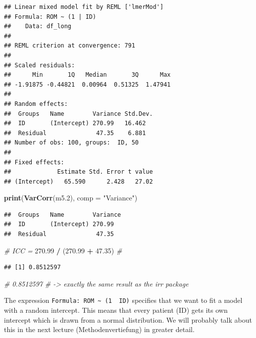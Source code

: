 \documentclass[
]{book}
\newenvironment{Shaded}{\begin{snugshade}}{\end{snugshade}}
\newcommand{\AttributeTok}[1]{\textcolor[rgb]{0.13,0.29,0.53}{#1}}
\newcommand{\CommentTok}[1]{\textcolor[rgb]{0.56,0.35,0.01}{\textit{#1}}}
\newcommand{\FloatTok}[1]{\textcolor[rgb]{0.00,0.00,0.81}{#1}}
\newcommand{\FunctionTok}[1]{\textcolor[rgb]{0.13,0.29,0.53}{\textbf{#1}}}
\newcommand{\NormalTok}[1]{#1}
\newcommand{\SpecialCharTok}[1]{\textcolor[rgb]{0.81,0.36,0.00}{\textbf{#1}}}
\newcommand{\StringTok}[1]{\textcolor[rgb]{0.31,0.60,0.02}{#1}}
\begin{document}
\begin{verbatim}
## Linear mixed model fit by REML ['lmerMod']
## Formula: ROM ~ (1 | ID)
##    Data: df_long
## 
## REML criterion at convergence: 791
## 
## Scaled residuals: 
##      Min       1Q   Median       3Q      Max 
## -1.91875 -0.44821  0.00964  0.51325  1.47941 
## 
## Random effects:
##  Groups   Name        Variance Std.Dev.
##  ID       (Intercept) 270.99   16.462  
##  Residual              47.35    6.881  
## Number of obs: 100, groups:  ID, 50
## 
## Fixed effects:
##             Estimate Std. Error t value
## (Intercept)   65.590      2.428   27.02
\end{verbatim}

\begin{Shaded}
\begin{Highlighting}[]
\FunctionTok{print}\NormalTok{(}\FunctionTok{VarCorr}\NormalTok{(m5}\FloatTok{.2}\NormalTok{), }\AttributeTok{comp =} \StringTok{"Variance"}\NormalTok{)}
\end{Highlighting}
\end{Shaded}

\begin{verbatim}
##  Groups   Name        Variance
##  ID       (Intercept) 270.99  
##  Residual              47.35
\end{verbatim}

\begin{Shaded}
\begin{Highlighting}[]
\CommentTok{\# ICC = }
\FloatTok{270.99} \SpecialCharTok{/}\NormalTok{ (}\FloatTok{270.99} \SpecialCharTok{+} \FloatTok{47.35}\NormalTok{) }\CommentTok{\# }
\end{Highlighting}
\end{Shaded}

\begin{verbatim}
## [1] 0.8512597
\end{verbatim}

\begin{Shaded}
\begin{Highlighting}[]
\CommentTok{\# 0.8512597}
\CommentTok{\# {-}\textgreater{} exactly the same result as the irr package}
\end{Highlighting}
\end{Shaded}

The expression \texttt{Formula:\ ROM\ \textasciitilde{}\ (1\ \textbar{}\ ID)} specifies that we want to fit a model with
a random intercept. This means that every patient (ID) gets its own intercept
which is drawn from a normal distribution. We will probably talk about this in the
next lecture (Methodenvertiefung) in greater detail.
\end{document}

